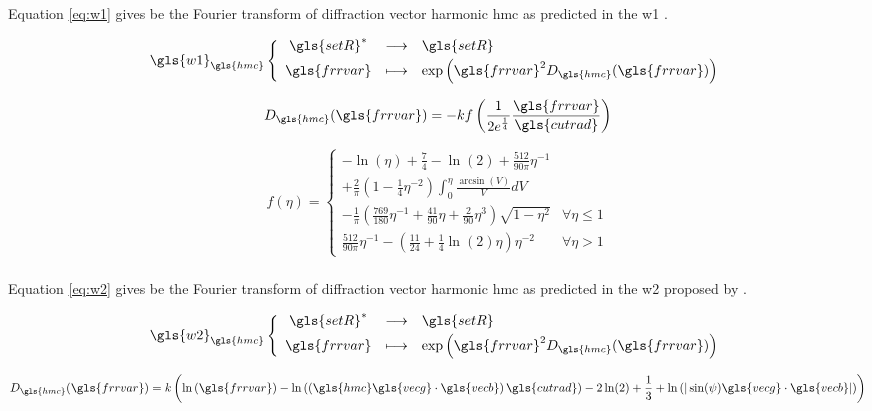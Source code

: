 Equation \eqref{eq:w1} gives be the Fourier transform of diffraction vector harmonic \gls{hmc} as predicted in the \gls{w1} \cite{W1970}.

\begin{equation}
  \define{
    \gls{w1}_{\gls{hmc}}
  }{
    \gls{setR}^*
  }{
    \gls{setR}
  }{
    \gls{frrvar}
  }{
    \exp\left( \gls{frrvar}^2 D_{\gls{hmc}}(\gls{frrvar}) \right)
  }
  \label{eq:w1}
\end{equation}

\begin{equation}
  D_{\gls{hmc}}(\gls{frrvar}) =
    - k f \left( \frac{1}{2e^\frac{1}{4}} \frac{\gls{frrvar}}{\gls{cutrad}} \right)
\end{equation}

\medskip

\begin{equation}
  f(\eta) =
    \begin{cases}
      - \ln(\eta) + \frac{7}{4} - \ln(2) + \frac{512}{90 \pi} \eta^{-1} \\[5mm]
      + \frac{2}{\pi} \left( 1 - \frac{1}{4}\eta^{-2} \right) \int_0^\eta \frac{\arcsin(V)}{V} dV \\[5mm]
      - \frac{1}{\pi} \left( \frac{769}{180} \eta^{-1} + \frac{41}{90} \eta + \frac{2}{90}\eta^3 \right) \sqrt{ 1 - \eta^2 }
      & \forall \eta \leq 1 \\[1cm]
      \frac{512}{90 \pi} \eta^{-1} - \left( \frac{11}{24} + \frac{1}{4} \ln(2) \eta \right) \eta^{-2}
      & \forall \eta > 1
    \end{cases}
\end{equation}

\subsubsection{}

Equation \eqref{eq:w2} gives be the Fourier transform of diffraction vector harmonic \gls{hmc} as predicted in the \gls{w2} proposed by \textcite{KD2001}.

\begin{equation}
  \define{
    \gls{w2}_{\gls{hmc}}
  }{
    \gls{setR}^*
  }{
    \gls{setR}
  }{
    \gls{frrvar}
  }{
    \exp\left( \gls{frrvar}^2 D_{\gls{hmc}}(\gls{frrvar}) \right)
  }
  \label{eq:w2}
\end{equation}

\begin{equation}
  D_{\gls{hmc}}(\gls{frrvar}) =
    k \left( \ln \left( \gls{frrvar} \right) - \ln\left( \left( \gls{hmc} \gls{vecg} \cdot \gls{vecb} \right) \gls{cutrad} \right) - 2 \ln(2) +\frac{1}{3} + \ln\left(|\sin(\psi) \gls{vecg} \cdot \gls{vecb}| \right) \right)
\end{equation}

